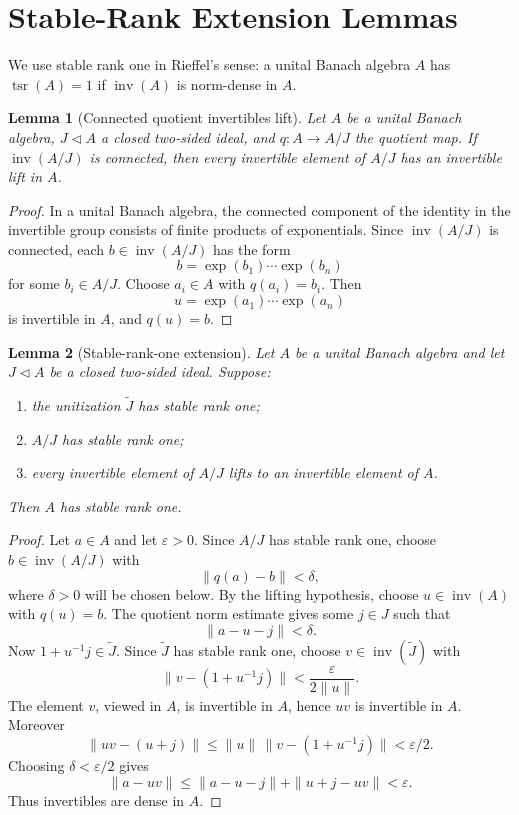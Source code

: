 \documentclass[11pt]{amsart}
\newtheorem{lemma}{Lemma}
\newcommand{\inv}{\operatorname{inv}}
\newcommand{\tsr}{\operatorname{tsr}}
\begin{document}
\section{Stable-Rank Extension Lemmas}

We use stable rank one in Rieffel's sense: a unital Banach algebra \(A\) has
\(\tsr(A)=1\) if \(\inv(A)\) is norm-dense in \(A\).

\begin{lemma}[Connected quotient invertibles lift]\label{lem:connected-lift}
Let \(A\) be a unital Banach algebra, \(J\triangleleft A\) a closed two-sided
ideal, and \(q:A\to A/J\) the quotient map.  If \(\inv(A/J)\) is connected,
then every invertible element of \(A/J\) has an invertible lift in \(A\).
\end{lemma}

\begin{proof}
In a unital Banach algebra, the connected component of the identity in the
invertible group consists of finite products of exponentials.  Since
\(\inv(A/J)\) is connected, each \(b\in\inv(A/J)\) has the form
\[
        b=\exp(b_1)\cdots \exp(b_n)
\]
for some \(b_i\in A/J\).  Choose \(a_i\in A\) with \(q(a_i)=b_i\).  Then
\[
        u=\exp(a_1)\cdots \exp(a_n)
\]
is invertible in \(A\), and \(q(u)=b\).
\end{proof}

\begin{lemma}[Stable-rank-one extension]\label{lem:extension}
Let \(A\) be a unital Banach algebra and let \(J\triangleleft A\) be a closed
two-sided ideal.  Suppose:
\begin{enumerate}
\item the unitization \(\widetilde J\) has stable rank one;
\item \(A/J\) has stable rank one;
\item every invertible element of \(A/J\) lifts to an invertible element of
      \(A\).
\end{enumerate}
Then \(A\) has stable rank one.
\end{lemma}

\begin{proof}
Let \(a\in A\) and let \(\varepsilon>0\).  Since \(A/J\) has stable rank one,
choose \(b\in\inv(A/J)\) with
\[
        \|q(a)-b\|<\delta ,
\]
where \(\delta>0\) will be chosen below.  By the lifting hypothesis, choose
\(u\in\inv(A)\) with \(q(u)=b\).  The quotient norm estimate gives some
\(j\in J\) such that
\[
        \|a-u-j\|<\delta .
\]
Now \(1+u^{-1}j\in \widetilde J\).  Since \(\widetilde J\) has stable rank
one, choose \(v\in\inv(\widetilde J)\) with
\[
        \|v-(1+u^{-1}j)\|<\frac{\varepsilon}{2\|u\|}.
\]
The element \(v\), viewed in \(A\), is invertible in \(A\), hence \(uv\) is
invertible in \(A\).  Moreover
\[
 \|uv-(u+j)\|
 \leq \|u\|\,\|v-(1+u^{-1}j)\|
 < \varepsilon/2.
\]
Choosing \(\delta<\varepsilon/2\) gives
\[
        \|a-uv\|\leq \|a-u-j\|+\|u+j-uv\|<\varepsilon .
\]
Thus invertibles are dense in \(A\).
\end{proof}
\end{document}
